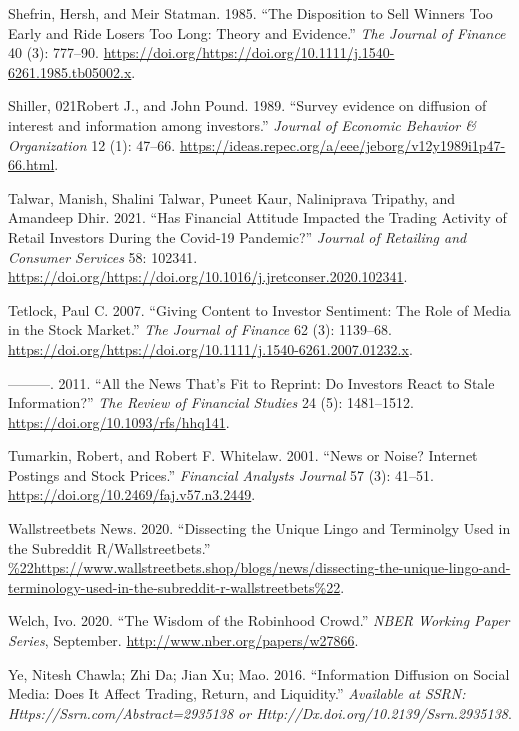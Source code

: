 \documentclass[12pt,]{article}
\begin{document}
\leavevmode\hypertarget{ref-shefrin1985}{}%
Shefrin, Hersh, and Meir Statman. 1985. ``The Disposition to Sell
Winners Too Early and Ride Losers Too Long: Theory and Evidence.''
\emph{The Journal of Finance} 40 (3): 777--90.
\url{https://doi.org/https://doi.org/10.1111/j.1540-6261.1985.tb05002.x}.

\leavevmode\hypertarget{ref-shiller1989}{}%
Shiller, 021Robert J., and John Pound. 1989. ``Survey evidence on
diffusion of interest and information among investors.'' \emph{Journal
of Economic Behavior \& Organization} 12 (1): 47--66.
\url{https://ideas.repec.org/a/eee/jeborg/v12y1989i1p47-66.html}.

\leavevmode\hypertarget{ref-talwar2021}{}%
Talwar, Manish, Shalini Talwar, Puneet Kaur, Naliniprava Tripathy, and
Amandeep Dhir. 2021. ``Has Financial Attitude Impacted the Trading
Activity of Retail Investors During the Covid-19 Pandemic?''
\emph{Journal of Retailing and Consumer Services} 58: 102341.
\url{https://doi.org/https://doi.org/10.1016/j.jretconser.2020.102341}.

\leavevmode\hypertarget{ref-tetlock2007}{}%
Tetlock, Paul C. 2007. ``Giving Content to Investor Sentiment: The Role
of Media in the Stock Market.'' \emph{The Journal of Finance} 62 (3):
1139--68.
\url{https://doi.org/https://doi.org/10.1111/j.1540-6261.2007.01232.x}.

\leavevmode\hypertarget{ref-tetlock2011}{}%
---------. 2011. ``All the News That's Fit to Reprint: Do Investors
React to Stale Information?'' \emph{The Review of Financial Studies} 24
(5): 1481--1512. \url{https://doi.org/10.1093/rfs/hhq141}.

\leavevmode\hypertarget{ref-tumarkin2001}{}%
Tumarkin, Robert, and Robert F. Whitelaw. 2001. ``News or Noise?
Internet Postings and Stock Prices.'' \emph{Financial Analysts Journal}
57 (3): 41--51. \url{https://doi.org/10.2469/faj.v57.n3.2449}.

\leavevmode\hypertarget{ref-wsbshop}{}%
Wallstreetbets News. 2020. ``Dissecting the Unique Lingo and Terminolgy
Used in the Subreddit R/Wallstreetbets.''
\url{\%22https://www.wallstreetbets.shop/blogs/news/dissecting-the-unique-lingo-and-terminology-used-in-the-subreddit-r-wallstreetbets\%22}.

\leavevmode\hypertarget{ref-welch2020}{}%
Welch, Ivo. 2020. ``The Wisdom of the Robinhood Crowd.'' \emph{NBER
Working Paper Series}, September.
\url{http://www.nber.org/papers/w27866}.

\leavevmode\hypertarget{ref-chawla2016}{}%
Ye, Nitesh Chawla; Zhi Da; Jian Xu; Mao. 2016. ``Information Diffusion
on Social Media: Does It Affect Trading, Return, and Liquidity.''
\emph{Available at SSRN: Https://Ssrn.com/Abstract=2935138 or
Http://Dx.doi.org/10.2139/Ssrn.2935138}.





\newpage
\singlespacing 
\end{document}
